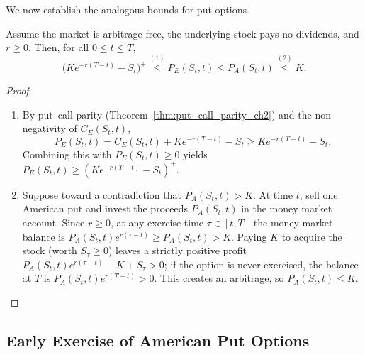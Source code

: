 We now establish the analogous bounds for put options.

\begin{lemma}
\label{lem:put_bounds}
Assume the market is arbitrage-free, the underlying stock pays no dividends, and $r \ge 0$. Then, for all $0 \le t \le T$,
\[
    \bigl(K e^{-r(T-t)} - S_t\bigr)^+ \stackrel{(1)}{\le} P_E(S_t, t) \le P_A(S_t, t) \stackrel{(2)}{\le} K.
\]
\end{lemma}

\begin{proof}
\begin{enumerate}
    \item By put--call parity (Theorem~\ref{thm:put_call_parity_ch2}) and the non-negativity of $C_E(S_t, t)$,
    \[
        P_E(S_t, t) = C_E(S_t, t) + K e^{-r(T-t)} - S_t \ge K e^{-r(T-t)} - S_t.
    \]
    Combining this with $P_E(S_t, t) \ge 0$ yields $P_E(S_t, t) \ge (K e^{-r(T-t)} - S_t)^+$.
    \item Suppose toward a contradiction that $P_A(S_t, t) > K$. At time $t$, sell one American put and invest the proceeds $P_A(S_t, t)$ in the money market account. Since $r \ge 0$, at any exercise time $\tau \in [t, T]$ the money market balance is $P_A(S_t, t) e^{r(\tau - t)} \ge P_A(S_t, t) > K$. Paying $K$ to acquire the stock (worth $S_\tau \ge 0$) leaves a strictly positive profit $P_A(S_t, t) e^{r(\tau - t)} - K + S_\tau > 0$; if the option is never exercised, the balance at $T$ is $P_A(S_t, t) e^{r(T-t)} > 0$. This creates an arbitrage, so $P_A(S_t, t) \le K$.
\end{enumerate}
\end{proof}

\subsection*{Early Exercise of American Put Options}

